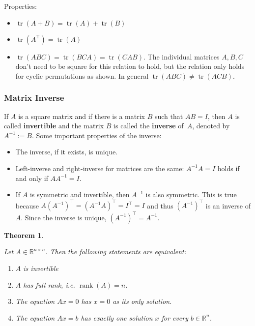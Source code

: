 \documentclass[
  a4paper,
]{article}
\providecommand{\tightlist}{%
  \setlength{\itemsep}{0pt}\setlength{\parskip}{0pt}}
\newtheorem{theorem}{Theorem}[section]
\theoremstyle{definition}
\theoremstyle{definition}
\theoremstyle{definition}
\theoremstyle{definition}
\theoremstyle{remark}
\begin{document}
Properties:

\begin{itemize}
\item
  \(\mathop{\mathrm{tr}}(A+B) = \mathop{\mathrm{tr}}(A) + \mathop{\mathrm{tr}}(B)\)
\item
  \(\mathop{\mathrm{tr}}(A^\top) = \mathop{\mathrm{tr}}(A)\)
\item
  \(\mathop{\mathrm{tr}}(ABC) = \mathop{\mathrm{tr}}(BCA) = \mathop{\mathrm{tr}}(CAB)\). The individual matrices \(A, B, C\) don't
  need to be square for this relation to hold, but the relation only holds for
  cyclic permutations as shown. In general \(\mathop{\mathrm{tr}}(ABC) \neq \mathop{\mathrm{tr}}(ACB)\).
\end{itemize}

\hypertarget{matrix-inverse}{%
\subsubsection{Matrix Inverse}\label{matrix-inverse}}

If \(A\) is a square matrix and if there is a matrix \(B\) such that
\(AB = I\), then \(A\) is called \textbf{invertible} and the matrix \(B\) is
called the \textbf{inverse} of~\(A\), denoted by \(A^{-1} := B\).
Some important properties of the inverse:

\begin{itemize}
\item
  The inverse, if it exists, is unique.
\item
  Left-inverse and right-inverse for matrices are the same:
  \(A^{-1} A = I\) holds if and only if \(A A^{-1} = I\).
\item
  If \(A\) is symmetric and invertible, then \(A^{-1}\) is also
  symmetric. This is true because \(A (A^{-1})^\top = (A^{-1} A)^\top = I^\top = I\) and thus \((A^{-1})^\top\) is an inverse of \(A\).
  Since the inverse is unique, \((A^{-1})^\top = A^{-1}\).
\end{itemize}

\begin{theorem}
\protect\hypertarget{thm:matrix-inverse}{}\label{thm:matrix-inverse}

Let \(A \in \mathbb{R}^{n\times n}\). Then the following statements are equivalent:

\begin{enumerate}
\def\labelenumi{\alph{enumi}.}
\tightlist
\item
  \(A\) is invertible
\item
  \(A\) has full rank, \emph{i.e.} \(\mathop{\mathrm{rank}}(A) = n\).
\item
  The equation \(Ax = 0\) has \(x = 0\) as its only solution.
\item
  The equation \(Ax = b\) has exactly one solution \(x\) for every
  \(b\in\mathbb{R}^n\).
\end{enumerate}

\end{theorem}
\end{document}

